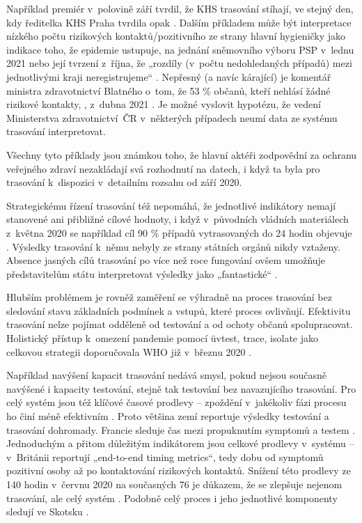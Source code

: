 Například premiér v~polovině září tvrdil, že KHS trasování stíhají, ve stejný den, kdy ředitelka KHS Praha tvrdila opak \cite{tr_denik_cz}. Dalším příkladem může být interpretace nízkého počtu rizikových kontaktů/pozitivního ze strany hlavní hygieničky jako indikace toho, že epidemie ustupuje, na jednání sněmovního výboru PSP v~lednu 2021 \cite{tr_denik_n} nebo její tvrzení z~října, že „rozdíly (v~počtu nedohledaných případů) mezi jednotlivými kraji neregistrujeme“ \cite{tr_novinky_cz}. Nepřesný (a navíc kárající) je komentář ministra zdravotnictví Blatného o~tom, že 53 \% občanů, kteří nehlásí žádné rizikové kontakty, , z~dubna 2021 \cite{tr_tvidnes_cz}. Je možné vyslovit hypotézu, že vedení Ministerstva zdravotnictví~ČR v~některých případech neumí data ze systému trasování interpretovat. 

Všechny tyto příklady jsou známkou toho, že hlavní aktéři zodpovědní za ochranu veřejného zdraví nezakládají svá rozhodnutí na datech, i když ta byla pro trasování k~dispozici v~detailním rozsahu od září 2020.

Strategickému řízení trasování též nepomáhá, že jednotlivé indikátory nemají stanovené ani přibližné cílové hodnoty, i když v~původních vládních materiálech z~května 2020 se například cíl 90 \% případů vytrasovaných do 24 hodin objevuje \cite{tr_vlada01}. Výsledky trasování k~němu nebyly ze strany státních orgánů nikdy vztaženy. Absence jasných cílů trasování po více než roce fungování ovšem umožňuje představitelům státu interpretovat výsledky jako „fantastické“ \cite{tr_vlada02}.

Hlubším problémem je rovněž zaměření se výhradně na proces trasování bez sledování stavu základních podmínek a vstupů, které proces ovlivňují. Efektivitu trasování nelze pojímat odděleně od testování a od ochoty občanů spolupracovat. Holistický přístup k~omezení pandemie pomocí üv{test, trace, isolate} jako celkovou strategii doporučovala WHO již v~březnu 2020 \cite{tr_WHO_02}.

Například navýšení kapacit trasování nedává smysl, pokud nejsou současně na\-vý\-še\-né i kapacity testování, stejně tak testování bez navazujícího trasování. Pro celý systém jsou též klíčové časové prodlevy -- zpoždění v~jakékoliv fázi procesu ho činí méně efektivním \cite{tr_systems_successful_2020}. Proto většina zemí reportuje výsledky testování a trasování dohromady. Francie sleduje čas mezi propuknutím symptomů a testem \cite{tr_france}. Jednoduchým a přitom důležitým indikátorem jsou celkové prodlevy v~systému -- v~Británii reportují „end-to-end timing metrics“, tedy dobu od symptomů pozitivní osoby až po kontaktování rizikových kontaktů. Snížení této prodlevy ze 140 hodin v~červnu 2020 na současných 76 je důkazem, že se zlepšuje nejenom trasování, ale celý systém \cite{tr_gov_uk01}. Podobně celý proces i jeho jednotlivé komponenty sledují ve Skotsku \cite{tr_scotland}.

